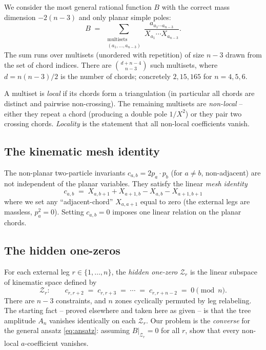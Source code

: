 \documentclass[11pt]{article}
\newcommand{\Zr}{\mathcal{Z}}
\begin{document}
We consider the most general rational function $B$ with the correct mass
dimension $-2(n-3)$ and only planar simple poles:
\begin{equation}\label{eq:ansatz}
B \;=\; \sum_{\substack{\text{multisets}\\ (a_1, \dots, a_{n-3})}}
\frac{a_{a_1\cdots a_{n-3}}}{X_{a_1}\cdots X_{a_{n-3}}}.
\end{equation}
The sum runs over multisets (unordered with repetition) of size $n-3$
drawn from the set of chord indices. There are
$\binom{d + n - 4}{n - 3}$ such multisets, where $d = n(n-3)/2$ is the
number of chords; concretely $2, 15, 165$ for $n = 4, 5, 6$.

A multiset is \emph{local} if its chords form a triangulation (in
particular all chords are distinct and pairwise non-crossing). The
remaining multisets are \emph{non-local} -- either they repeat a chord
(producing a double pole $1/X^2$) or they pair two crossing chords.
\emph{Locality} is the statement that all non-local coefficients vanish.

\subsection{The kinematic mesh identity}

The non-planar two-particle invariants $c_{a,b} = 2 p_a \cdot p_b$
(for $a \ne b$, non-adjacent) are not independent of the planar
variables. They satisfy the linear \emph{mesh identity}
\begin{equation}\label{eq:mesh}
\boxed{c_{a,b} \;=\; X_{a, b+1} + X_{a+1, b} - X_{a, b} - X_{a+1, b+1}}
\end{equation}
where we set any ``adjacent-chord'' $X_{a, a+1}$ equal to zero (the
external legs are massless, $p_a^2 = 0$). Setting $c_{a,b} = 0$ imposes
one linear relation on the planar chords.

\subsection{The hidden one-zeros}

For each external leg $r \in \{1, \dots, n\}$, the \emph{hidden one-zero}
$\Zr_r$ is the linear subspace of kinematic space defined by
\[
\Zr_r:\qquad c_{r, r+2} \;=\; c_{r, r+3} \;=\; \cdots \;=\; c_{r, r+n-2} \;=\; 0
\pmod{n}.
\]
There are $n-3$ constraints, and $n$ zones cyclically permuted by leg
relabeling. The starting fact -- proved elsewhere and taken here as
given -- is that the tree amplitude $A_n$ vanishes identically on each
$\Zr_r$. Our problem is the \emph{converse} for the general ansatz
\eqref{eq:ansatz}: assuming $B|_{\Zr_r} = 0$ for all $r$, show that
every non-local $a$-coefficient vanishes.
\end{document}
